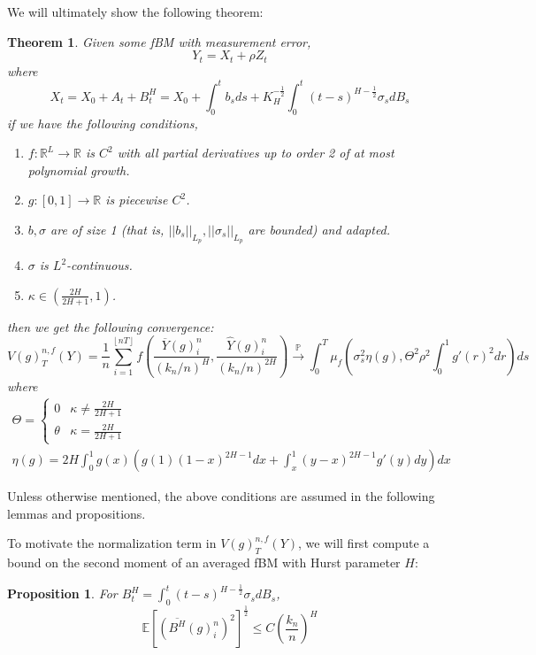 \documentclass[12pt,letterpaper]{article}
\newtheorem{theorem}{Theorem}
\newtheorem{prop}{Proposition}
\theoremstyle{definition}
\newcommand{\R}{\mathbb{R}}
\newcommand{\E}{\mathbb{E}}
\begin{document}
We will ultimately show the following theorem:
\begin{theorem}
  Given some fBM with measurement error, 
  \begin{equation}
    Y_t = X_t + \rho Z_t
  \end{equation}
  where
  \begin{equation}
    X_t = X_0 + A_t + B_t^H = X_0 + \int_0^tb_sds + K_H^{-\frac{1}{2}}\int_0^t(t-s)^{H - \frac{1}{2}}\sigma_sdB_s
  \end{equation}
  if we have the following conditions, %
  \begin{enumerate}
    \item \(f: \R^L \rightarrow \R\) is \(C^2\) with all partial derivatives up to order 2 of at most polynomial growth.
    \item \(g: [0,1] \rightarrow \R\) is piecewise \(C^2\).
    \item \(b, \sigma\) are of size 1 (that is, \(||b_s||_{L_p}, ||\sigma_s||_{L_p}\) are bounded) and adapted.
    \item \(\sigma\) is \(L^2\)-continuous.
    \item \(\kappa \in \left(\frac{2H}{2H+1}, 1\right)\).
  \end{enumerate}
  then we get the following convergence:
  \begin{equation}
    V(g)^{n,f}_T(Y) = \frac{1}{n}\sum_{i=1}^{\left\lfloor nT \right\rfloor}f\left( \frac{\overline{Y}(g)^n_i}{\left( k_n/n \right)^H}, \frac{\widehat{Y}(g)^n_i}{\left( k_n/n \right)^{2H}} \right) \overset{\mathbb{P}}{\rightarrow} \int_0^T \mu_f\left( \sigma_s^2\eta\left( g \right), \Theta^2\rho^2 \int_0^1g'(r)^2dr \right)ds
  \end{equation}
  where
  \begin{gather}
    \Theta =
    \begin{cases}
      0 & \kappa \neq \frac{2H}{2H+1} \\
      \theta &  \kappa = \frac{2H}{2H+1}
    \end{cases} \\
    \eta(g) = 2H\int_0^1g(x)\left(g(1)(1-x)^{2H-1}dx + \int_x^1(y-x)^{2H-1}g'(y)dy\right)dx
  \end{gather}
\end{theorem}
Unless otherwise mentioned, the above conditions are assumed in the following lemmas and propositions.

To motivate the normalization term in \(V(g)_T^{n,f}(Y)\), we will first compute a bound on the second moment of an averaged fBM with Hurst parameter \(H\):
\begin{prop}
  For \(B^H_t = \int_0^t(t-s)^{H - \frac{1}{2}}\sigma_sdB_s\), 
  \begin{equation}
    \E\left[ \left(\overline{B^H}(g)^n_i\right)^2 \right]^{\frac{1}{2}} \leq C\left( \frac{k_n}{n} \right)^H
  \end{equation}
\end{prop}
\end{document}
